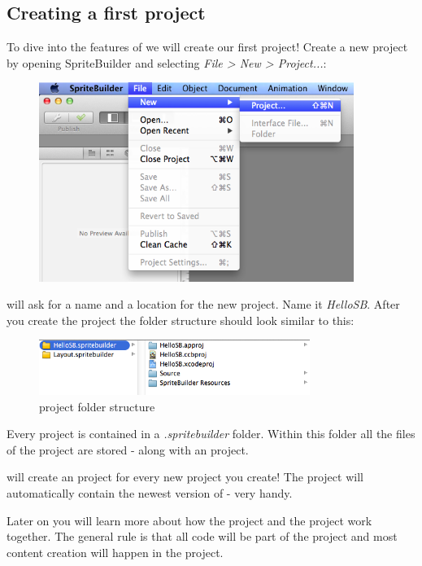 \subsection{Creating a first project}
To dive into the features of \SB{} we will create our first project! 
Create a new project by opening SpriteBuilder and selecting \textit{File > New >
Project...}:
\begin{figure}[H]
		\centering
		\includegraphics[width=290pt]{images/cocos2d/setup/spritebuilder_new_project.png}     
\end{figure}

\SB{} will ask for a name and a location for the new project. Name it
\textit{HelloSB}. After you create the project the folder structure should look similar to this:
\begin{figure}[H]
		\centering
		\includegraphics[width=250pt]{images/cocos2d/setup/project_structure.png}     
		\caption{\SB{} project folder structure}
\end{figure}

Every \SB{} project is contained in a \textit{.spritebuilder} folder. Within
this folder all the files of the \SB{} project are stored - along with an \xcode{}
project. 

\begin{lamp}[frametitle={\SB{} and Xcode}] 
\SB{} will create an \xcode{} project for every new project you create! The
\xcode{} project will automatically contain the newest version of \cocos{} -
very handy.
\end{lamp}

Later on you will learn more about how the \SB{} project and the \xcode{}
project work together. The general rule is that all code will be part of the
\xcode{} project and most content creation will happen in the \SB{} project.

